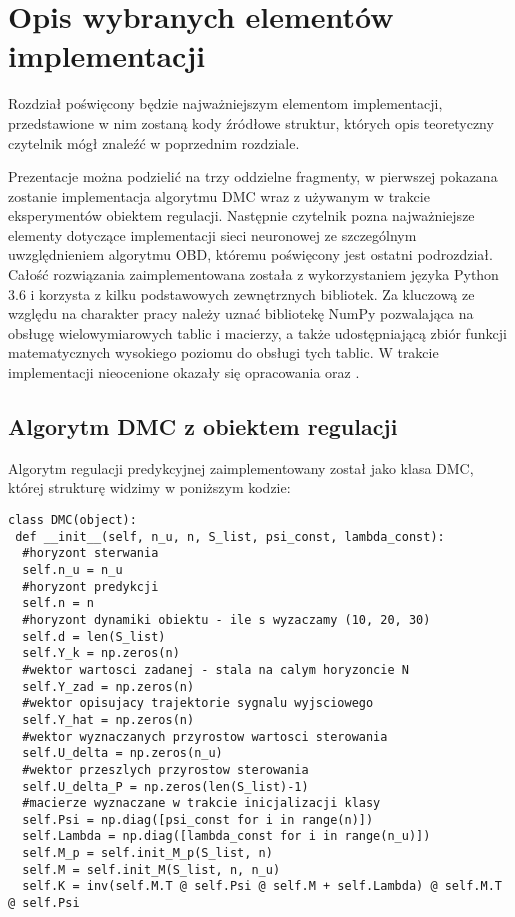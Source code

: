 \newpage %
\section{Opis wybranych elementów implementacji}
Rozdział poświęcony będzie najważniejszym elementom implementacji, przedstawione w nim zostaną kody źródłowe struktur, których opis teoretyczny czytelnik mógł znaleźć w poprzednim rozdziale. 
\par Prezentacje można podzielić na trzy oddzielne fragmenty, w pierwszej pokazana zostanie implementacja algorytmu DMC wraz z używanym w trakcie eksperymentów obiektem regulacji. Następnie czytelnik pozna najważniejsze elementy dotyczące implementacji sieci neuronowej ze szczególnym uwzględnieniem algorytmu OBD, któremu poświęcony jest ostatni podrozdział. Całość rozwiązania zaimplementowana została z wykorzystaniem języka Python 3.6 i korzysta z kilku podstawowych zewnętrznych bibliotek. Za kluczową ze względu na charakter pracy należy uznać bibliotekę NumPy pozwalająca na obsługę wielowymiarowych tablic i macierzy, a także udostępniającą zbiór funkcji matematycznych wysokiego poziomu do obsługi tych tablic. W trakcie implementacji nieocenione okazały się opracowania \cite{nielsen2015} oraz \cite{wawrzynski2019}. 

\subsection{Algorytm DMC z obiektem regulacji}
Algorytm regulacji predykcyjnej zaimplementowany został jako klasa DMC, której strukturę widzimy w poniższym kodzie:
\begin{listing}[!htb]
\begin{verbatim}
class DMC(object):
 def __init__(self, n_u, n, S_list, psi_const, lambda_const):		
  #horyzont sterwania 
  self.n_u = n_u
  #horyzont predykcji
  self.n = n 
  #horyzont dynamiki obiektu - ile s wyzaczamy (10, 20, 30)
  self.d = len(S_list)
  self.Y_k = np.zeros(n)
  #wektor wartosci zadanej - stala na calym horyzoncie N
  self.Y_zad = np.zeros(n)
  #wektor opisujacy trajektorie sygnalu wyjsciowego 
  self.Y_hat = np.zeros(n)
  #wektor wyznaczanych przyrostow wartosci sterowania 
  self.U_delta = np.zeros(n_u)
  #wektor przeszlych przyrostow sterowania
  self.U_delta_P = np.zeros(len(S_list)-1)		
  #macierze wyznaczane w trakcie inicjalizacji klasy
  self.Psi = np.diag([psi_const for i in range(n)])
  self.Lambda = np.diag([lambda_const for i in range(n_u)])
  self.M_p = self.init_M_p(S_list, n)
  self.M = self.init_M(S_list, n, n_u)
  self.K = inv(self.M.T @ self.Psi @ self.M + self.Lambda) @ self.M.T @ self.Psi
\end{verbatim}
\end{listing}

